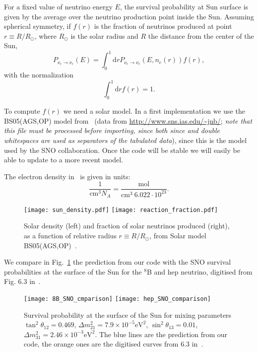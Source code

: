 \documentclass{article}
\newcommand{\cm}[0]{\text{cm}}
\newcommand{\de}[0]{\text{d}}
\begin{document}
For a fixed value of neutrino energy $E$, the survival probability at Sun surface is given by the average over the neutrino production point inside the Sun. Assuming spherical symmetry, if $f(r)$ is the fraction of neutrinos produced at point $r \equiv R/R_\odot$, where $R_\odot$ is the solar radius and $R$ the distance from the center of the Sun, 
\begin{equation}
	P_{\nu_e \rightarrow \nu_e}(E) = \int_0^1 \de r P_{\nu_e \rightarrow \nu_e}(E, n_e(r)) f(r),
\end{equation}
with the normalization
\begin{equation}
	\int_0^1 \de r f(r) = 1.
\end{equation}

To compute $f(r)$ we need a solar model. In a first implementation we use the BS05(AGS,OP) model from~\cite{Bahcall:2004pz} (data from \url{http://www.sns.ias.edu/~jnb/}; \emph{note that this file must be processed before importing, since both since and double whitespaces are used as separators of the tabulated data}), since this is the model used by the SNO collaboration. Once the code will be stable we will easily be able to update to a more recent model.

The electron density in~\cite{Bahcall:2004pz} is given in units:
\begin{equation}
	\frac{1}{\cm^3 N_A} = \frac{\text{mol}}{\cm^3\ 6.022 \cdot 10^{23} }.
\end{equation}
	
\begin{figure}[ht]
\texttt{[image: sun\_density.pdf]}
\texttt{[image: reaction\_fraction.pdf]}
\caption{Solar density (left) and fraction of solar neutrinos produced (right), as a function of relative radius $r \equiv R/R_\odot$, from Solar model BS05(AGS,OP)~\cite{Bahcall:2004pz}.}
\end{figure}

We compare in Fig.~\ref{fig:SNO_8B_hep_comparison} the prediction from our code with the SNO survival probabilities at the surface of the Sun for the ${}^8$B and hep neutrino, digitised from Fig. 6.3 in~\cite{FiuzadeBarros:2011qna}. 

\begin{figure}[ht]
	\texttt{[image: 8B\_SNO\_cmparison]}
	\texttt{[image: hep\_SNO\_comparison]}
	\caption{Survival probability at the surface of the Sun for mixing parameters $\tan^2\theta_{12} = 0.469$, $\Delta m_{21}^2 = 7.9 \times 10^{-5} \text{eV}^2$, $\sin^2 \theta_{13} = 0.01$, $\Delta m_{31}^2 = 2.46 \times 10^{-3} \text{eV}^2$. The blue lines are the prediction from our code, the orange ones are the digitised curves from 6.3 in~\cite{FiuzadeBarros:2011qna}.}
	\label{fig:SNO_8B_hep_comparison}
\end{figure}
\end{document}
